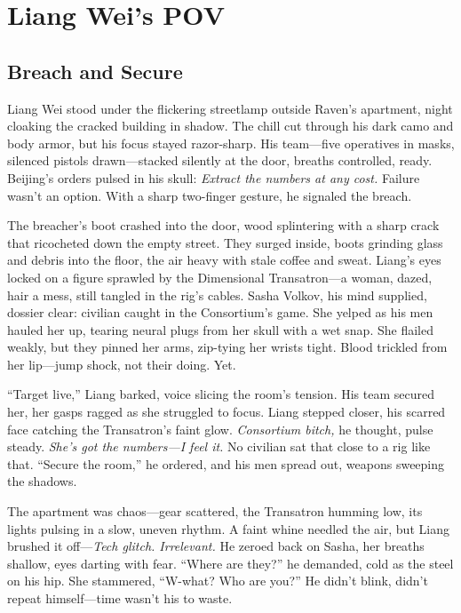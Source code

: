 \documentclass[12pt]{book}
\begin{document}
\chapter{Liang Wei’s POV}
\section{Breach and Secure}

Liang Wei stood under the flickering streetlamp outside Raven’s apartment, night cloaking the cracked building in shadow. The chill cut through his dark camo and body armor, but his focus stayed razor-sharp. His team---five operatives in masks, silenced pistols drawn---stacked silently at the door, breaths controlled, ready. Beijing’s orders pulsed in his skull: \textit{Extract the numbers at any cost.} Failure wasn’t an option. With a sharp two-finger gesture, he signaled the breach.

The breacher’s boot crashed into the door, wood splintering with a sharp crack that ricocheted down the empty street. They surged inside, boots grinding glass and debris into the floor, the air heavy with stale coffee and sweat. Liang’s eyes locked on a figure sprawled by the Dimensional Transatron---a woman, dazed, hair a mess, still tangled in the rig’s cables. Sasha Volkov, his mind supplied, dossier clear: civilian caught in the Consortium’s game. She yelped as his men hauled her up, tearing neural plugs from her skull with a wet snap. She flailed weakly, but they pinned her arms, zip-tying her wrists tight. Blood trickled from her lip---jump shock, not their doing. Yet.

``Target live,'' Liang barked, voice slicing the room’s tension. His team secured her, her gasps ragged as she struggled to focus. Liang stepped closer, his scarred face catching the Transatron’s faint glow. \textit{Consortium bitch,} he thought, pulse steady. \textit{She’s got the numbers---I feel it.} No civilian sat that close to a rig like that. ``Secure the room,'' he ordered, and his men spread out, weapons sweeping the shadows.

The apartment was chaos---gear scattered, the Transatron humming low, its lights pulsing in a slow, uneven rhythm. A faint whine needled the air, but Liang brushed it off---\textit{Tech glitch. Irrelevant.} He zeroed back on Sasha, her breaths shallow, eyes darting with fear. ``Where are they?'' he demanded, cold as the steel on his hip. She stammered, ``W-what? Who are you?'' He didn’t blink, didn’t repeat himself---time wasn’t his to waste.
\end{document}
